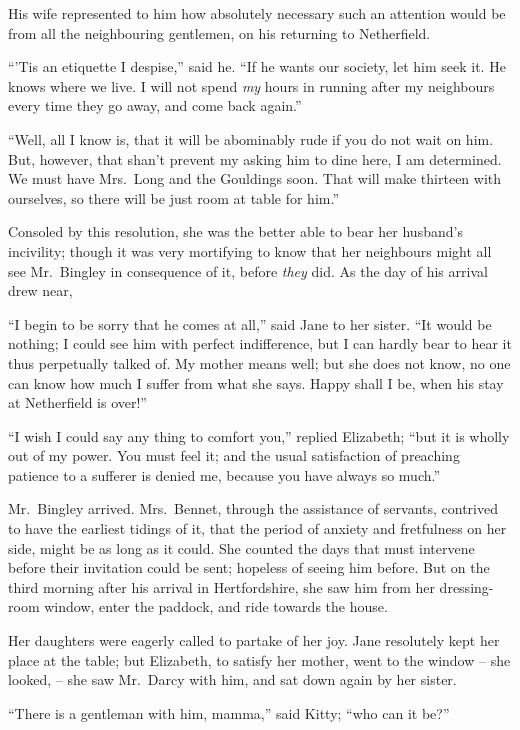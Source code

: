 His wife represented to him how absolutely necessary
such an attention would be from all the neighbouring
gentlemen, on his returning to Netherfield.

“’Tis an etiquette I despise,” said he. “If he wants
our society, let him seek it. He knows where we live.
I will not spend \textit{my} hours in running after my neighbours
every time they go away, and come back again.”

“Well, all I know is, that it will be abominably rude
if you do not wait on him. But, however, that shan’t
prevent my asking him to dine here, I am determined.
We must have Mrs.\ Long and the Gouldings soon. That
will make thirteen with ourselves, so there will be just
room at table for him.”

Consoled by this resolution, she was the better able to
bear her husband’s incivility; though it was very mortifying
to know that her neighbours might all see Mr.\ Bingley
in consequence of it, before \textit{they} did. As the day of his
arrival drew near,

“I begin to be sorry that he comes at all,” said Jane
to her sister. “It would be nothing; I could see him
with perfect indifference, but I can hardly bear to hear
it thus perpetually talked of. My mother means well;
but she does not know, no one can know how much
I suffer from what she says. Happy shall I be, when his
stay at Netherfield is over!”

“I wish I could say any thing to comfort you,” replied
Elizabeth; “but it is wholly out of my power. You
must feel it; and the usual satisfaction of preaching
patience to a sufferer is denied me, because you have
always so much.”

Mr.\ Bingley arrived. Mrs.\ Bennet, through the assistance
of servants, contrived to have the earliest tidings
of it, that the period of anxiety and fretfulness on her
side, might be as long as it could. She counted the days
that must intervene before their invitation could be sent;
hopeless of seeing him before. But on the third morning
after his arrival in Hertfordshire, she saw him from her
dressing-room window, enter the paddock, and ride towards
the house.

Her daughters were eagerly called to partake of her joy.
Jane resolutely kept her place at the table; but Elizabeth,
to satisfy her mother, went to the window -- she looked, -- she
saw Mr.\ Darcy with him, and sat down again by her
sister.

“There is a gentleman with him, mamma,” said Kitty;
“who can it be?”

